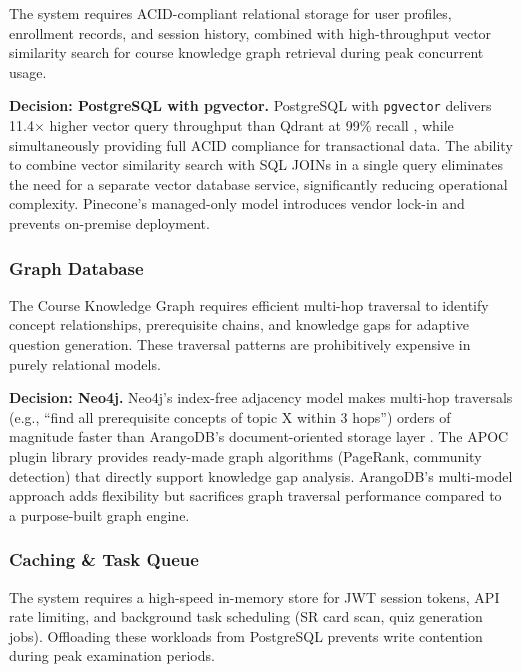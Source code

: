 The system requires ACID-compliant relational storage for user profiles, enrollment records, and session history, combined with high-throughput vector similarity search for course knowledge graph retrieval during peak concurrent usage.


\textbf{Decision: PostgreSQL with pgvector.} PostgreSQL with \texttt{pgvector} delivers 11.4$\times$ higher vector query throughput than Qdrant at 99\% recall \cite{tigerdata2025pgvector}, while simultaneously providing full ACID compliance for transactional data. The ability to combine vector similarity search with SQL JOINs in a single query eliminates the need for a separate vector database service, significantly reducing operational complexity. Pinecone's managed-only model introduces vendor lock-in and prevents on-premise deployment.

\subsubsection{Graph Database}

The Course Knowledge Graph requires efficient multi-hop traversal to identify concept relationships, prerequisite chains, and knowledge gaps for adaptive question generation. These traversal patterns are prohibitively expensive in purely relational models.


\textbf{Decision: Neo4j.} Neo4j's index-free adjacency model makes multi-hop traversals (e.g., ``find all prerequisite concepts of topic X within 3 hops'') orders of magnitude faster than ArangoDB's document-oriented storage layer \cite{neo4j2024graph}. The APOC plugin library provides ready-made graph algorithms (PageRank, community detection) that directly support knowledge gap analysis. ArangoDB's multi-model approach adds flexibility but sacrifices graph traversal performance compared to a purpose-built graph engine.

\subsubsection{Caching \& Task Queue}

The system requires a high-speed in-memory store for JWT session tokens, API rate limiting, and background task scheduling (SR card scan, quiz generation jobs). Offloading these workloads from PostgreSQL prevents write contention during peak examination periods.


